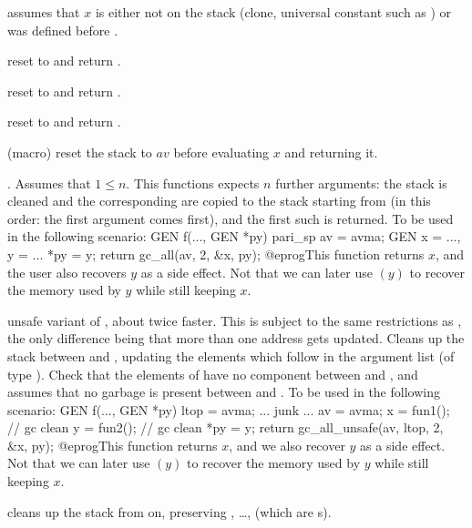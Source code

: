  assumes that $x$ is either not on the
stack (clone, universal constant such as ) or was defined
before .

 reset  to  and return
.

 reset  to  and return
.

 reset  to  and return
.

 (macro) reset the stack to $av$
before evaluating $x$ and returning it.

. Assumes that $1 \leq n$. This
functions expects $n$ further 
arguments: the stack is cleaned and the corresponding  are
copied to the stack starting from  (in this order: the first argument
comes first), and the first such  is returned. To be used in the
following scenario:
\bprog
  GEN f(..., GEN *py)
  {
    pari_sp av = avma;
    GEN x = ..., y = ...
    *py = y; return gc_all(av, 2, &x, py);
  }
@eprog\noindent This function returns $x$, and the user also recovers $y$
as a side effect. Not that we can later use $(y)$ to recover the
memory used by $y$ while still keeping $x$.

 unsafe
variant of , about twice faster. This is subject to the same
restrictions as , the only difference being that more than
one address gets updated. Cleans up the stack between  and
, updating the  elements which follow  in the
argument list (of type ). Check that the elements of  have
no component between  and , and assumes that no garbage is
present between  and . To be used in the following
scenario:
\bprog
  GEN f(..., GEN *py)
  {
    ltop = avma;
    ... junk ...
    av = avma;
    x = fun1();  // gc clean
    y = fun2();  // gc clean
    *py = y; return gc_all_unsafe(av, ltop, 2, &x, py);
  }
@eprog\noindent This function returns $x$, and we also recover $y$
as a side effect. Not that we can later use $(y)$ to recover the
memory used by $y$ while still keeping $x$.

 cleans up the stack
from  on, preserving , \dots,  (which are
s).

